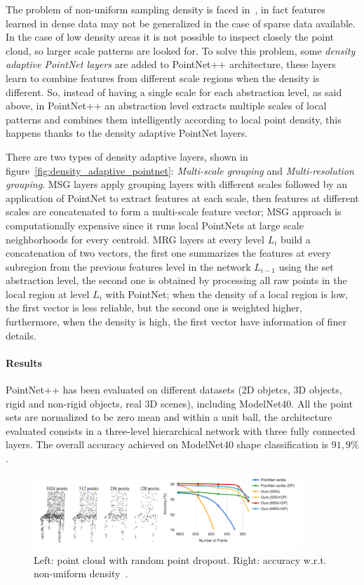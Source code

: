 The problem of non-uniform sampling density is faced in~\cite{qi2017pointnet++}, in fact features learned in dense data may not be generalized in the case of sparse data available. In the case of low density areas it is not possible to inspect closely the point cloud, so larger scale patterns are looked for. To solve this problem, some \textit{density adaptive PointNet layers} are added to PointNet++ architecture, these layers learn to combine features from different scale regions when the density is different. So, instead of having a single scale for each abstraction level, as said above, in PointNet++ an abstraction level extracts multiple scales of local patterns and combines them intelligently according to local point density, this happens thanks to the density adaptive PointNet layers. 

There are two types of density adaptive layers, shown in figure~\ref{fig:density_adaptive_pointnet}: \textit{Multi-scale grouping} and \textit{Multi-resolution grouping}. MSG layers apply grouping layers with different scales followed by an application of PointNet to extract features at each scale, then features at different scales are concatenated to form a multi-scale feature vector; MSG approach is computationally expensive since it runs local PointNets at large scale neighborhoods for every centroid. MRG layers at every level $L_i$ build a concatenation of two vectors, the first one summarizes the features at every subregion from the previous features level in the network $L_{i-1}$ using the set abstraction level, the second one is obtained by processing all raw points in the local region at level $L_i$ with PointNet; when the density of a local region is low, the first vector is less reliable, but the second one is weighted higher, furthermore, when the density is high, the first vector have information of finer details.

\paragraph{Results}

PointNet++ has been evaluated on different datasets (2D objetcs, 3D objects, rigid and non-rigid objects,  real 3D scenes), including ModelNet40. All the point sets are normalized to be zero mean and within a unit ball, the architecture evaluated consists in a three-level hierarchical network with three fully connected layers. The overall accuracy achieved on ModelNet40 shape classification is $91,9 \%$.

\begin{figure}[ht]
    \centering
    \includegraphics[width=0.9\textwidth]{images/pointnet++_density_robustness.png}
    \caption{Left: point cloud with random point dropout. Right: accuracy w.r.t. non-uniform density~\cite{qi2017pointnet++}.}
    \label{fig:pointnet++_density_robustness}
\end{figure}

